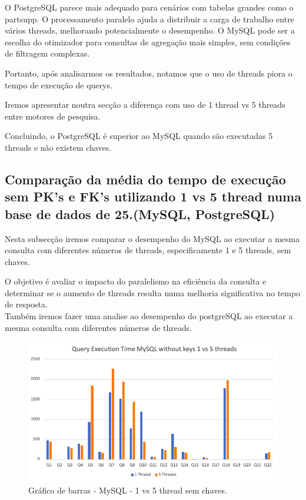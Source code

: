 \documentclass{article}
\begin{document}
O PostgreSQL parece mais adequado para cenários com tabelas grandes como o partsupp. O processamento paralelo ajuda a distribuir a carga de trabalho entre vários threads, melhorando potencialmente o desempenho.
O MySQL pode ser a escolha do otimizador para consultas de agregação mais simples, sem condições de filtragem complexas.

Portanto, após analisarmos os resultados, notamos que o uso de threads piora o tempo de execução de querys.

Iremos apresentar noutra secção a diferença com uso de 1 thread vs 5 threads entre motores de pesquisa.

Concluindo, o PostgreSQL é superior ao MySQL quando são executadas 5 threads e não existem chaves.

\clearpage
  \subsection{Comparação da média do tempo de execução sem PK's e FK's
  utilizando 1 vs 5 thread numa base de dados de 25.(MySQL, PostgreSQL)}
  
  \quad Nesta subsecção iremos comparar o desempenho do MySQL ao executar a mesma consulta com diferentes números de threads, especificamente 1 e 5 threads, sem chaves. 
  
  O objetivo é avaliar o impacto do paralelismo na eficiência da consulta e determinar se o aumento de threads resulta numa melhoria significativa no tempo de resposta.\\
  
  Também iremos fazer uma analise ao desempenho do postgreSQL ao executar a mesma consulta com diferentes números de threads.

  \begin{figure}[H]
    \centering
    \includegraphics[width=\textwidth]{Graphs/mysql_withoutkeys_1vs5threads.png}
    \caption{Gráfico de barras - MySQL - 1 vs 5 thread sem chaves.} 
    \label{fig:PKCreation2}
  \end{figure}
  
\end{document}

